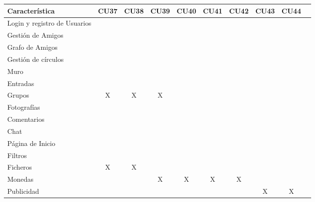\documentclass[12pt, a4paper, titlepage]{article}
\begin{document}
\begin{center}

\begin{tabular}{|p{3cm}|c|c|c|c|c|c|c|c|c|}
\hline 
\textbf{Característica} & CU37 & CU38  & CU39 & CU40 & CU41 & CU42 & CU43 & CU44 \\ 
\hline 
Login y registro de Usuarios&   &    &   &   &   &   &   &     \\ 
\hline 
Gestión de Amigos &   &    &   &   &   &   &   &     \\ 
\hline 
Grafo de Amigos&   &    &   &   &   &   &   &     \\ 
\hline 
Gestión de círculos&   &    &   &   &   &   &   &      \\ 
\hline 
Muro&   &    &   &   &   &   &   &      \\ 
\hline 
Entradas&   &    &   &   &   &   &   &     \\ 
\hline 
Grupos & X   & X   & X  &   &   &   &   &     \\ 
\hline 
Fotografías &   &    &   &   &   &  &   &     \\ 
\hline 
Comentarios &   &    &   &   &   &   &   &    \\ 
\hline 
Chat&   &    &   &   &   &   &   &      \\ 
\hline 
Página de Inicio &   &    &   &   &   &   &   &     \\ 
\hline 
Filtros &   &    &   &   &   &   &   &     \\ 
\hline 
Ficheros &  X & X   &   &   &   &   &   &      \\  
\hline 
Monedas &   &    & X  &  X &  X & X  &   &      \\ 
\hline 
Publicidad &   &    &   &   &   &   & X  &  X   \\ 
\hline  
\end{tabular} 
\end{center}




\end{document}
